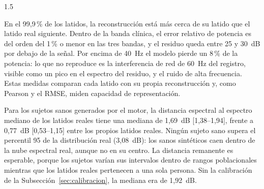 \begin{spacing}{1.5}
\begin{table}[H]
\centering
{}

\vspace{0.3cm}
\caption{Fidelidad espectral de la reconstrucción: medianas y, entre corchetes, percentiles 25 y 75 sobre los 2.237 latidos.}
\label{tab:espectral}
\end{table}

En el 99,9\,\% de los latidos, la reconstrucción está más cerca de su latido que el latido real siguiente. Dentro de la banda clínica, el error relativo de potencia es del orden del 1\,\% o menor en las tres bandas, y el residuo queda entre 25 y 30~dB por debajo de la señal. Por encima de 40~Hz el modelo pierde un 8\,\% de la potencia: lo que no reproduce es la interferencia de red de 60~Hz del registro, visible como un pico en el espectro del residuo, y el ruido de alta frecuencia. Estas medidas comparan cada latido con su propia reconstrucción y, como Pearson y el RMSE, miden capacidad de representación.

Para los sujetos sanos generados por el motor, la distancia espectral al espectro mediano de los latidos reales tiene una mediana de 1,69~dB [1,38--1,94], frente a 0,77~dB [0,53--1,15] entre los propios latidos reales. Ningún sujeto sano supera el percentil 95 de la distribución real (3,08~dB): los sanos sintéticos caen dentro de la nube espectral real, aunque no en su centro. La distancia remanente es esperable, porque los sujetos varían sus intervalos dentro de rangos poblacionales mientras que los latidos reales pertenecen a una sola persona. Sin la calibración de la Subsección~\ref{sec:calibracion}, la mediana era de 1,92~dB.


\end{spacing}
